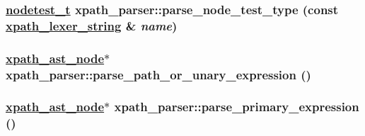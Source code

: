 \hypertarget{structxpath__parser_7b4555d7bfdb90971333c46963d5d791}{
\subsubsection[parse\_\-node\_\-test\_\-type]{\setlength{\rightskip}{0pt plus 5cm}\hyperlink{pugixml_8cpp_b268b4264276130baeb17ab629015275}{nodetest\_\-t} xpath\_\-parser::parse\_\-node\_\-test\_\-type (const \hyperlink{structxpath__lexer__string}{xpath\_\-lexer\_\-string} \& {\em name})}}
\label{structxpath__parser_7b4555d7bfdb90971333c46963d5d791}


\hypertarget{structxpath__parser_9f5cab421e931c46b0598ecec60c5591}{
\subsubsection[parse\_\-path\_\-or\_\-unary\_\-expression]{\setlength{\rightskip}{0pt plus 5cm}\hyperlink{classxpath__ast__node}{xpath\_\-ast\_\-node}$\ast$ xpath\_\-parser::parse\_\-path\_\-or\_\-unary\_\-expression ()}}
\label{structxpath__parser_9f5cab421e931c46b0598ecec60c5591}


\hypertarget{structxpath__parser_320728b83e426c4874066d633ffe65d9}{
\subsubsection[parse\_\-primary\_\-expression]{\setlength{\rightskip}{0pt plus 5cm}\hyperlink{classxpath__ast__node}{xpath\_\-ast\_\-node}$\ast$ xpath\_\-parser::parse\_\-primary\_\-expression ()}}
\label{structxpath__parser_320728b83e426c4874066d633ffe65d9}



